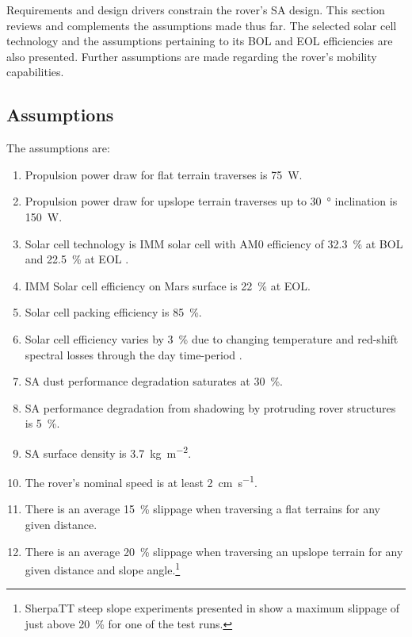 Requirements and design drivers constrain the rover's \ac{SA} design. This section reviews and complements the assumptions made thus far. The selected solar cell technology and the assumptions pertaining to its \ac{BOL} and \ac{EOL} efficiencies are also presented. Further assumptions are made regarding the rover's mobility capabilities.

\subsection{Assumptions}
\label{sec:RequirementsAndDesignDrivers:Assumptions}
The assumptions are:

\resetLeadingZeroCounter
\begin{enumerate}[leftmargin=1.31cm, label=\zeroLeadCounter{A}]
    \item Propulsion power draw for flat terrain traverses is \SI{75}{\watt}.
    \item Propulsion power draw for upslope terrain traverses up to \SI{30}{\degree} inclination is \SI{150}{\watt}.
    \item Solar cell technology is \ac{IMM} solar cell with AM0 efficiency of \SI{32.3}{\percent} at \ac{BOL} and \SI{22.5}{\percent} at \ac{EOL} .
    \item \label{itm:ass:solar_cell_efficiency} \ac{IMM} Solar cell efficiency on Mars surface is \SI{22}{\percent} at \ac{EOL}.
    \item \label{itm:ass:packing_efficiency} Solar cell packing efficiency is \SI{85}{\percent}.
    \item \label{itm:ass:red_shifts} Solar cell efficiency varies by \SI{3}{\percent} due to changing temperature and red-shift spectral losses through the day time-period .
    \item \label{itm:ass:dust_deposition_saturation} \ac{SA} dust performance degradation saturates at \SI{30}{\percent}.
    \item \label{itm:ass:protruding_shadowing} \ac{SA} performance degradation from shadowing by protruding rover structures is \SI{5}{\percent}.
    \item \label{itm:ass:sa_surface_density} \ac{SA} surface density is \SI{3.7}{kg.m^{-2}}.
    \item The rover's nominal speed is at least \SI{2}{cm.s^{-1}}.
    \item There is an average \SI{15}{\percent} slippage when traversing a flat terrains for any given distance.
    \item There is an average \SI{20}{\percent} slippage when traversing an upslope terrain for any given distance and slope angle.\footnote{SherpaTT steep slope experiments presented in  show a maximum slippage of just above \SI{20}{\percent} for one of the test runs.}
\end{enumerate}


